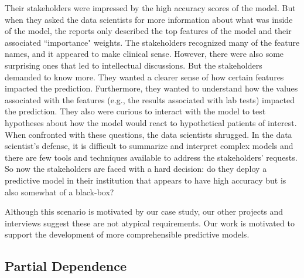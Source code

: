 Their stakeholders were impressed by the high accuracy scores of the model.  But when they asked the data scientists for more information about what was inside of the model, the reports only described the top features of the model and their associated ``importance" weights.  The stakeholders recognized many of the feature names, and it appeared to make clinical sense.  However, there were also some surprising ones that led to intellectual discussions.  But the stakeholders demanded to know more.  They wanted a clearer sense of how certain features impacted the prediction.  Furthermore, they wanted to understand how the values associated with the features (e.g., the results associated with lab tests) impacted the prediction.  They also were curious to interact with the model to test hypotheses about how the model would react to hypothetical patients of interest.  When confronted with these questions, the data scientists shrugged.  In the data scientist's defense, it is difficult to summarize and interpret complex models and there are few tools and techniques available to address the stakeholders' requests.  So now the stakeholders are faced with a hard decision:  do they deploy a predictive model in their institution that appears to have high accuracy but is also somewhat of a black-box?

Although this scenario is motivated by our case study, our other projects and interviews suggest these are not atypical requirements.  Our work is motivated to support the development of more comprehensible predictive models. 

\subsection{Partial Dependence}


